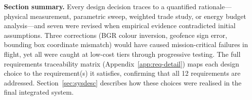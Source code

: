 \medskip
\noindent\textbf{Section summary.} Every design decision traces to a quantified rationale---physical measurement, parametric sweep, weighted trade study, or energy budget analysis---and seven were revised when empirical evidence contradicted initial assumptions. Three corrections (BGR colour inversion, geofence sign error, bounding box coordinate mismatch) would have caused mission-critical failures in flight, yet all were caught at low-cost tiers through progressive testing. The full requirements traceability matrix (Appendix~\ref{app:req-detail}) maps each design choice to the requirement(s) it satisfies, confirming that all 12 requirements are addressed. Section~\ref{sec:sysdesc} describes how these choices were realised in the final integrated system.
